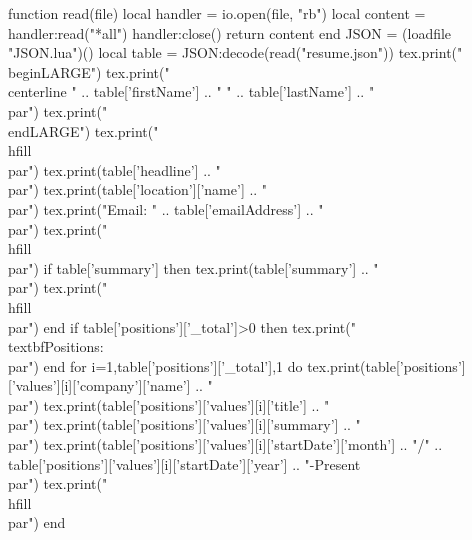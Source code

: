 \documentclass{article}
\begin{document}
\begin{luacode}
function read(file)
    local handler = io.open(file, "rb")
    local content = handler:read("*all")
    handler:close()
    return content
end
JSON = (loadfile "JSON.lua")()
local table = JSON:decode(read("resume.json"))
tex.print("\\begin{LARGE}")
tex.print("\\centerline {" .. table['firstName'] .. " " .. table['lastName'] .. "}\\par")
tex.print("\\end{LARGE}")
tex.print("\\hfill\\par")
tex.print(table['headline'] .. "\\par")
tex.print(table['location']['name'] .. "\\par")
tex.print("Email: " .. table['emailAddress'] .. "\\par")
tex.print("\\hfill\\par")
if table['summary'] then
  tex.print(table['summary'] .. "\\par")
  tex.print("\\hfill\\par")
end
if table['positions']['_total']>0 then
  tex.print("\\textbf{Positions:}\\par")
end
for i=1,table['positions']['_total'],1 do
  tex.print(table['positions']['values'][i]['company']['name'] .. "\\par")
  tex.print(table['positions']['values'][i]['title'] .. "\\par")
  tex.print(table['positions']['values'][i]['summary'] .. "\\par")
  tex.print(table['positions']['values'][i]['startDate']['month'] .. "/" .. table['positions']['values'][i]['startDate']['year'] .. "-Present\\par")
  tex.print("\\hfill\\par")
end

\end{luacode}
\end{document}
